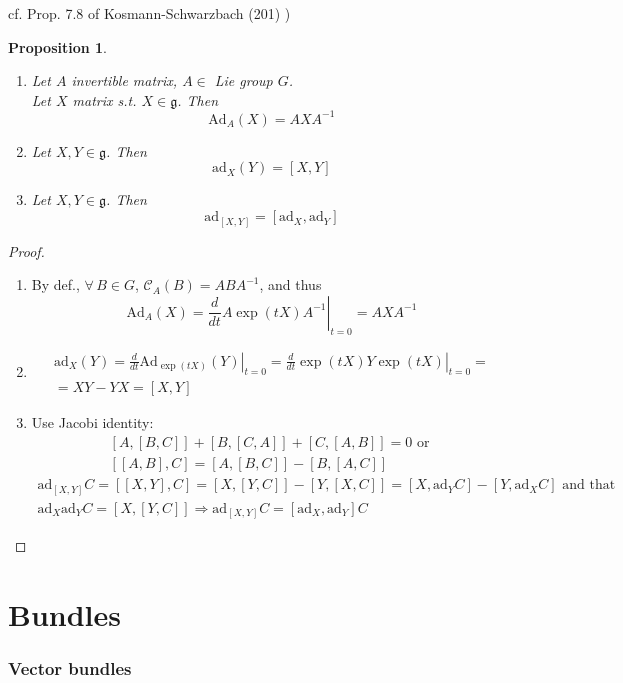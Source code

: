 \documentclass[10pt]{amsart}
\newtheorem{proposition}{Proposition}
\begin{document}
\begin{multicols*}{2}
cf. Prop. 7.8 of Kosmann-Schwarzbach (201) \cite{YKosmann-Schwarzbach2010})
\begin{proposition}
  \begin{enumerate}
\item Let $A$ invertible matrix, $A \in $ Lie group $G$.  \\
Let $X$ matrix s.t. $X \in \mathfrak{g}$.  Then
\[
\text{Ad}_A(X) = AXA^{-1}
\]
\item Let $X,Y \in \mathfrak{g}$.  Then 
\[
\text{ad}_X(Y) = [X,Y]
\]
\item Let $X,Y \in \mathfrak{g}$.  Then 
\[
\text{ad}_{[X,Y]} = [ \text{ad}_X, \text{ad}_Y ]
\]
\end{enumerate}
\end{proposition}
\begin{proof}
  \begin{enumerate}
\item By def., $\forall \, B \in G$, $\mathcal{C}_A(B) = ABA^{-1}$, and thus
\[
\text{Ad}_A(X) = \left. \frac{d}{dt} A\exp{ (tX)  }A^{-1} \right|_{t=0} = AXA^{-1}
\]
\item \[
\begin{gathered}
  \text{ad}_X(Y) = \left. \frac{d}{dt} \text{Ad}_{\exp{(tX)}}(Y) \right|_{t=0} = \left. \frac{d}{dt} \exp{(tX)} Y \exp{(tX)} \right|_{t=0} = \\
  = XY - YX = [X,Y] 
\end{gathered}
\]
\item Use Jacobi identity: 
\[
\begin{gathered}
  [A,[B,C]] +  [B,[C,A]] +  [C,[A,B]] = 0 \text{ or } \\ 
  [[A,B],C] = [A,[B,C]] - [B,[A,C]]
\end{gathered}
\] 
\[
\begin{gathered}
  \text{ad}_{[X,Y]}C = [[X,Y],C] = [X,[Y,C]] - [Y,[X,C]] = [X,\text{ad}_YC] - [Y,\text{ad}_XC] \text{ and that } \\ 
  \text{ad}_X\text{ad}_Y C = [X,[Y,C]] \Longrightarrow \text{ad}_{[X,Y]}C = [\text{ad}_X,\text{ad}_Y ] C
\end{gathered}
\]
\end{enumerate}
\end{proof}


\part{Bundles}

\cite{CTaubes2011}


\section{Vector bundles}


\end{multicols*}
\end{document}
